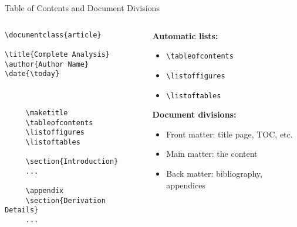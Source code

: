 \begin{frame}[fragile]{Table of Contents and Document Divisions}
     \begin{columns}
          \begin{column}{0.5\textwidth}
               \begin{lstlisting}
\documentclass{article}

\title{Complete Analysis}
\author{Author Name}
\date{\today}


     
     \maketitle
     \tableofcontents
     \listoffigures
     \listoftables
     
     \section{Introduction}
     ...
     
     \appendix
     \section{Derivation Details}
     ...
     

               \end{lstlisting}
          \end{column}
          
          \begin{column}{0.5\textwidth}
               \textbf{Automatic lists:}
               \begin{itemize}
                    \item \texttt{\textbackslash tableofcontents}
                    \item \texttt{\textbackslash listoffigures}
                    \item \texttt{\textbackslash listoftables}
               \end{itemize}
               
               \textbf{Document divisions:}
               \begin{itemize}
                    \item Front matter: title page, TOC, etc.
                    \item Main matter: the content
                    \item Back matter: bibliography, appendices
               \end{itemize}
               

\end{column}
\end{columns}
\end{frame}
